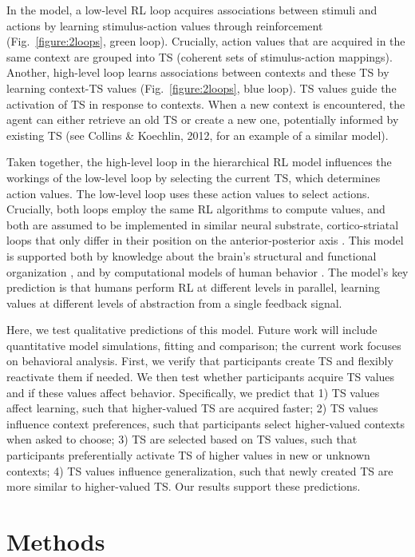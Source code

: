 \documentclass[10pt, letterpaper]{article}
\begin{document}
In the model, a low-level RL loop acquires associations between stimuli and actions by learning stimulus-action values through reinforcement (Fig.~\ref{figure:2loops}, green loop). Crucially, action values that are acquired in the same context are grouped into TS (coherent sets of stimulus-action mappings). Another, high-level loop learns associations between contexts and these TS by learning context-TS values (Fig.~\ref{figure:2loops}, blue loop). TS values guide the activation of TS in response to contexts. When a new context is encountered, the agent can either retrieve an old TS or create a new one, potentially informed by existing TS (see Collins \& Koechlin, 2012, for an example of a similar model).

Taken together, the high-level loop in the hierarchical RL model influences the workings of the low-level loop by selecting the current TS, which determines action values. The low-level loop uses these action values to select actions. Crucially, both loops employ the same RL algorithms to compute values, and both are assumed to be implemented in similar neural substrate, cortico-striatal loops that only differ in their position on the anterior-posterior axis \cite{alexander_parallel_1986}. This model is supported both by knowledge about the brain's structural and functional organization \cite{alexander_parallel_1986, badre_mechanisms_2012}, and by computational models of human behavior \cite{frank_mechanisms_2012}. The model's key prediction is that humans perform RL at different levels in parallel, learning values at different levels of abstraction from a single feedback signal.

Here, we test qualitative predictions of this model. Future work will include quantitative model simulations, fitting and comparison; the current work focuses on behavioral analysis. First, we verify that participants create TS and flexibly reactivate them if needed. We then test whether participants acquire TS values and if these values affect behavior. Specifically, we predict that 1) TS values affect learning, such that higher-valued TS are acquired faster; 2) TS values influence context preferences, such that participants select higher-valued contexts when asked to choose; 3) TS are selected based on TS values, such that participants preferentially activate TS of higher values in new or unknown contexts; 4) TS values influence generalization, such that newly created TS are more similar to higher-valued TS. Our results support these predictions.


\section{Methods}
\end{document}
